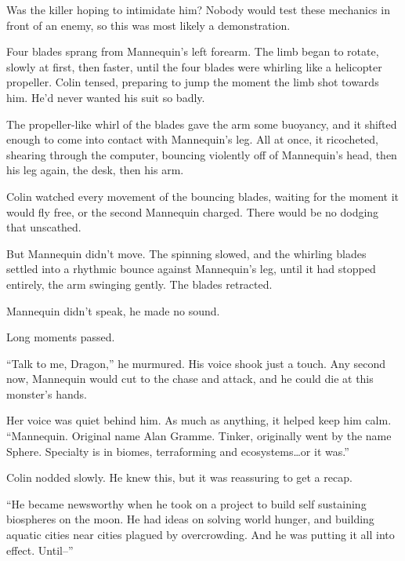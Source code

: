 Was the killer hoping to intimidate him?  Nobody would test these mechanics in front of an enemy, so this was most likely a demonstration.



Four blades sprang from Mannequin's left forearm.  The limb began to rotate, slowly at first, then faster, until the four blades were whirling like a helicopter propeller.  Colin tensed, preparing to jump the moment the limb shot towards him.  He'd never wanted his suit so badly.



The propeller-like whirl of the blades gave the arm some buoyancy, and it shifted enough to come into contact with Mannequin's leg.  All at once, it ricocheted, shearing through the computer, bouncing violently off of Mannequin's head, then his leg again, the desk, then his arm.



Colin watched every movement of the bouncing blades, waiting for the moment it would fly free, or the second Mannequin charged.  There would be no dodging that unscathed.



But Mannequin didn't move.  The spinning slowed, and the whirling blades settled into a rhythmic bounce against Mannequin's leg, until it had stopped entirely, the arm swinging gently.  The blades retracted.



Mannequin didn't speak, he made no sound.



Long moments passed.



``Talk to me, Dragon,'' he murmured.  His voice shook just a touch.  Any second now, Mannequin would cut to the chase and attack, and he could die at this monster's hands.



Her voice was quiet behind him.  As much as anything, it helped keep him calm.  ``Mannequin.  Original name Alan Gramme.  Tinker, originally went by the name Sphere.  Specialty is in biomes, terraforming and ecosystems\ldots or it was.''



Colin nodded slowly.  He knew this, but it was reassuring to get a recap.



``He became newsworthy when he took on a project to build self sustaining biospheres on the moon.  He had ideas on solving world hunger, and building aquatic cities near cities plagued by overcrowding.  And he was putting it all into effect.  Until--''




